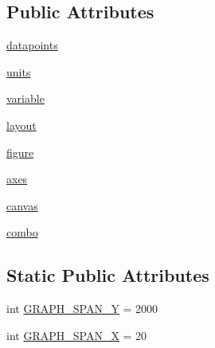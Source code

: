 \subsection*{Public Attributes}
\begin{DoxyCompactItemize}
\item 
\mbox{\hyperlink{classwindshape_1_1gui_1_1widgets_1_1plots_1_1_plot_widget_1_1_plot_widget_a59cd16ef607c7048453da460ef007b34}{datapoints}}
\item 
\mbox{\hyperlink{classwindshape_1_1gui_1_1widgets_1_1plots_1_1_plot_widget_1_1_plot_widget_a98aaf281403da895891038a2ee27e1f9}{units}}
\item 
\mbox{\hyperlink{classwindshape_1_1gui_1_1widgets_1_1plots_1_1_plot_widget_1_1_plot_widget_a740aa3698f6d10d8b3d352d69f890a7d}{variable}}
\item 
\mbox{\hyperlink{classwindshape_1_1gui_1_1widgets_1_1plots_1_1_plot_widget_1_1_plot_widget_ad1ff2d1e6d32684bf694c4ace03c3145}{layout}}
\item 
\mbox{\hyperlink{classwindshape_1_1gui_1_1widgets_1_1plots_1_1_plot_widget_1_1_plot_widget_a15c1ec8b8d8490656251af8b7c5ee0d0}{figure}}
\item 
\mbox{\hyperlink{classwindshape_1_1gui_1_1widgets_1_1plots_1_1_plot_widget_1_1_plot_widget_a63bceb1e1693b11b6de9cd9c820ee004}{axes}}
\item 
\mbox{\hyperlink{classwindshape_1_1gui_1_1widgets_1_1plots_1_1_plot_widget_1_1_plot_widget_a9e5272786b2920aa9b94f602ed518dc9}{canvas}}
\item 
\mbox{\hyperlink{classwindshape_1_1gui_1_1widgets_1_1plots_1_1_plot_widget_1_1_plot_widget_a5f09abea7f8d8a9a652782b67f3d4558}{combo}}
\end{DoxyCompactItemize}
\subsection*{Static Public Attributes}
\begin{DoxyCompactItemize}
\item 
int \mbox{\hyperlink{classwindshape_1_1gui_1_1widgets_1_1plots_1_1_plot_widget_1_1_plot_widget_af60b178501ffa93f6001848138d60b89}{G\+R\+A\+P\+H\+\_\+\+S\+P\+A\+N\+\_\+Y}} = 2000
\item 
int \mbox{\hyperlink{classwindshape_1_1gui_1_1widgets_1_1plots_1_1_plot_widget_1_1_plot_widget_a7bbaeecd2211eede520128d8733f51d6}{G\+R\+A\+P\+H\+\_\+\+S\+P\+A\+N\+\_\+X}} = 20
\end{DoxyCompactItemize}


